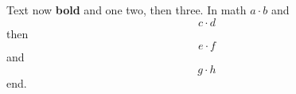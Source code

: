 \documentclass{article}
\newcommand{\op}[1]{#1\cdot}
\newcommand{\bold}[1]{#1 \bfseries}
\newcommand{\pad}[1]{#1 }
\begin{document}
Text {\bold{now} bold} and \pad{one} two, then \def\x{y} three.
In math $\op{a} b$ and
\[ \op{c} d \]
then
\begin{equation} \op{e} f \end{equation}
and $$\op{g} h$$ end.
\end{document}
